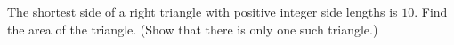The shortest side of a right triangle with positive integer side lengths is $10$. Find the area of the triangle. (Show that there is only one such triangle.)
